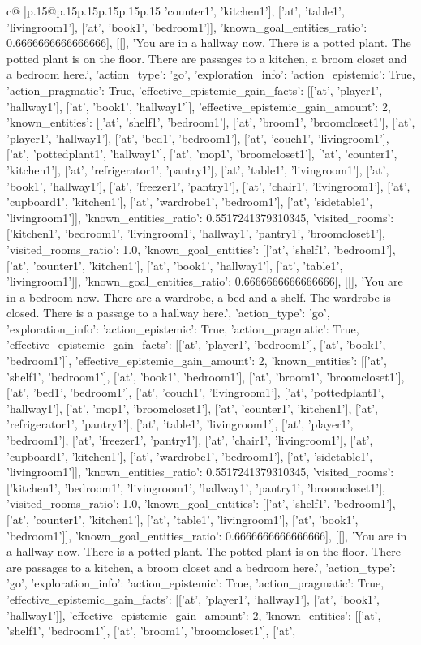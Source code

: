 \documentclass{article}
\begin{document}
{\begin{supertabular}{c@{$\;$}|p{.15\linewidth}@{}p{.15\linewidth}p{.15\linewidth}p{.15\linewidth}p{.15\linewidth}p{.15\linewidth}}
{{{'counter1', 'kitchen1'], ['at', 'table1', 'livingroom1'], ['at', 'book1', 'bedroom1']], 'known_goal_entities_ratio': 0.6666666666666666}}], [[], 'You are in a hallway now. There is a potted plant. The potted plant is on the floor. There are passages to a kitchen, a broom closet and a bedroom here.', {'action_type': 'go', 'exploration_info': {'action_epistemic': True, 'action_pragmatic': True, 'effective_epistemic_gain_facts': [['at', 'player1', 'hallway1'], ['at', 'book1', 'hallway1']], 'effective_epistemic_gain_amount': 2, 'known_entities': [['at', 'shelf1', 'bedroom1'], ['at', 'broom1', 'broomcloset1'], ['at', 'player1', 'hallway1'], ['at', 'bed1', 'bedroom1'], ['at', 'couch1', 'livingroom1'], ['at', 'pottedplant1', 'hallway1'], ['at', 'mop1', 'broomcloset1'], ['at', 'counter1', 'kitchen1'], ['at', 'refrigerator1', 'pantry1'], ['at', 'table1', 'livingroom1'], ['at', 'book1', 'hallway1'], ['at', 'freezer1', 'pantry1'], ['at', 'chair1', 'livingroom1'], ['at', 'cupboard1', 'kitchen1'], ['at', 'wardrobe1', 'bedroom1'], ['at', 'sidetable1', 'livingroom1']], 'known_entities_ratio': 0.5517241379310345, 'visited_rooms': ['kitchen1', 'bedroom1', 'livingroom1', 'hallway1', 'pantry1', 'broomcloset1'], 'visited_rooms_ratio': 1.0, 'known_goal_entities': [['at', 'shelf1', 'bedroom1'], ['at', 'counter1', 'kitchen1'], ['at', 'book1', 'hallway1'], ['at', 'table1', 'livingroom1']], 'known_goal_entities_ratio': 0.6666666666666666}}], [[], 'You are in a bedroom now. There are a wardrobe, a bed and a shelf. The wardrobe is closed. There is a passage to a hallway here.', {'action_type': 'go', 'exploration_info': {'action_epistemic': True, 'action_pragmatic': True, 'effective_epistemic_gain_facts': [['at', 'player1', 'bedroom1'], ['at', 'book1', 'bedroom1']], 'effective_epistemic_gain_amount': 2, 'known_entities': [['at', 'shelf1', 'bedroom1'], ['at', 'book1', 'bedroom1'], ['at', 'broom1', 'broomcloset1'], ['at', 'bed1', 'bedroom1'], ['at', 'couch1', 'livingroom1'], ['at', 'pottedplant1', 'hallway1'], ['at', 'mop1', 'broomcloset1'], ['at', 'counter1', 'kitchen1'], ['at', 'refrigerator1', 'pantry1'], ['at', 'table1', 'livingroom1'], ['at', 'player1', 'bedroom1'], ['at', 'freezer1', 'pantry1'], ['at', 'chair1', 'livingroom1'], ['at', 'cupboard1', 'kitchen1'], ['at', 'wardrobe1', 'bedroom1'], ['at', 'sidetable1', 'livingroom1']], 'known_entities_ratio': 0.5517241379310345, 'visited_rooms': ['kitchen1', 'bedroom1', 'livingroom1', 'hallway1', 'pantry1', 'broomcloset1'], 'visited_rooms_ratio': 1.0, 'known_goal_entities': [['at', 'shelf1', 'bedroom1'], ['at', 'counter1', 'kitchen1'], ['at', 'table1', 'livingroom1'], ['at', 'book1', 'bedroom1']], 'known_goal_entities_ratio': 0.6666666666666666}}], [[], 'You are in a hallway now. There is a potted plant. The potted plant is on the floor. There are passages to a kitchen, a broom closet and a bedroom here.', {'action_type': 'go', 'exploration_info': {'action_epistemic': True, 'action_pragmatic': True, 'effective_epistemic_gain_facts': [['at', 'player1', 'hallway1'], ['at', 'book1', 'hallway1']], 'effective_epistemic_gain_amount': 2, 'known_entities': [['at', 'shelf1', 'bedroom1'], ['at', 'broom1', 'broomcloset1'], ['at', }}}
\end{supertabular}}
\end{document}
